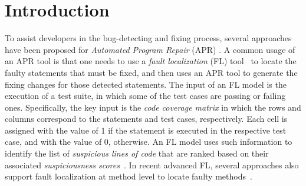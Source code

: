 \section{Introduction}

To assist developers in the bug-detecting and fixing process, several
approaches have been proposed for {\em Automated Program Repair} (APR)
\cite{LeGoues-icse12}. A common usage of an APR tool is that one needs
to use a {\em fault localization} (FL) tool~\cite{fl-survey} to locate
the faulty statements that must be fixed, and then uses an APR tool to
generate the fixing changes for those detected statements.
%
The input of an FL model is the execution of a test suite, in which
some of the test cases are passing or failing ones. Specifically, the
key input is the {\em code coverage matrix} in which the rows and
columns correspond to the statements and test cases, respectively.
Each cell is assigned with the value of 1 if the statement is executed
in the respective test case, and with the value of 0, otherwise.  An
FL model uses such information to identify the list of {\em suspicious
  lines of code} that are ranked based on their associated {\em
  suspiciousness scores}~\cite{fl-survey}. In recent advanced FL,
several approaches also support fault localization at method
level to locate faulty methods~\cite{DeepFL,icse21-fl}.



